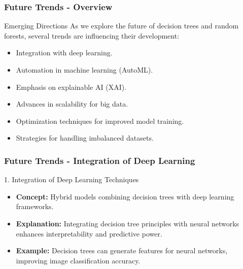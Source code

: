 \documentclass[aspectratio=169]{beamer}
\begin{document}
\begin{frame}[fragile]
  \frametitle{Future Trends - Overview}
  \begin{block}{Emerging Directions}
    As we explore the future of decision trees and random forests, several trends are influencing their development:
    \begin{itemize}
      \item Integration with deep learning.
      \item Automation in machine learning (AutoML).
      \item Emphasis on explainable AI (XAI).
      \item Advances in scalability for big data.
      \item Optimization techniques for improved model training.
      \item Strategies for handling imbalanced datasets.
    \end{itemize}
  \end{block}
\end{frame}

\begin{frame}[fragile]
  \frametitle{Future Trends - Integration of Deep Learning}
  \begin{block}{1. Integration of Deep Learning Techniques}
    \begin{itemize}
      \item \textbf{Concept:} Hybrid models combining decision trees with deep learning frameworks.
      \item \textbf{Explanation:} Integrating decision tree principles with neural networks enhances interpretability and predictive power.
      \item \textbf{Example:} Decision trees can generate features for neural networks, improving image classification accuracy.
    \end{itemize}
  \end{block}
\end{frame}
\end{document}
